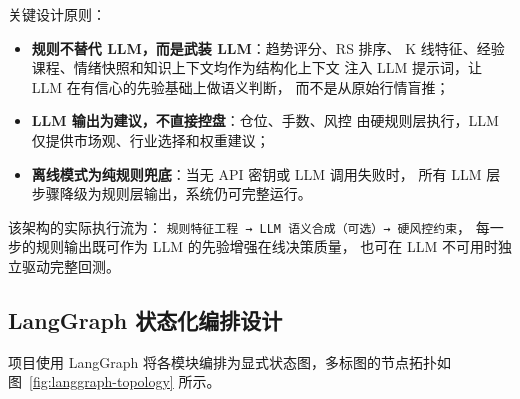 \documentclass[a4paper,11pt]{article}
\begin{document}
关键设计原则：
\begin{itemize}
    \item \textbf{规则不替代 LLM，而是武装 LLM}：趋势评分、RS 排序、
    K 线特征、经验课程、情绪快照和知识上下文均作为结构化上下文
    注入 LLM 提示词，让 LLM 在有信心的先验基础上做语义判断，
    而不是从原始行情盲推；
    \item \textbf{LLM 输出为建议，不直接控盘}：仓位、手数、风控
    由硬规则层执行，LLM 仅提供市场观、行业选择和权重建议；
    \item \textbf{离线模式为纯规则兜底}：当无 API 密钥或 LLM 调用失败时，
    所有 LLM 层步骤降级为规则层输出，系统仍可完整运行。
\end{itemize}

该架构的实际执行流为：
\texttt{规则特征工程 → LLM 语义合成（可选）→ 硬风控约束}，
每一步的规则输出既可作为 LLM 的先验增强在线决策质量，
也可在 LLM 不可用时独立驱动完整回测。

\subsection{LangGraph 状态化编排设计}

项目使用 LangGraph 将各模块编排为显式状态图，多标图的节点拓扑如图~\ref{fig:langgraph-topology} 所示。
\end{document}
